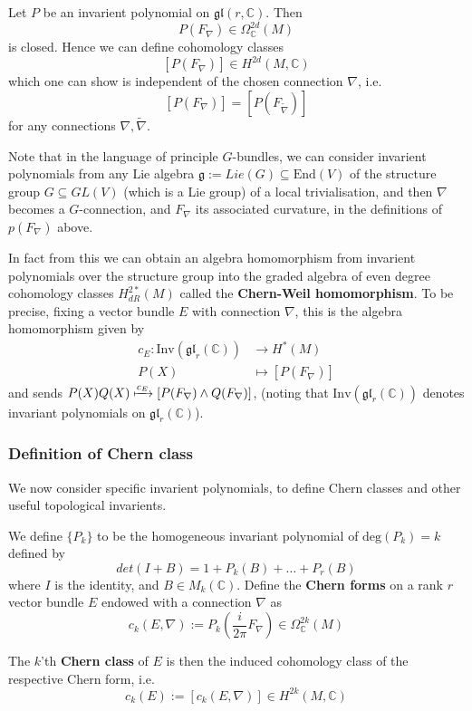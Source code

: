 \documentclass[a4paper]{article}
\theoremstyle{definition} \newtheorem*{definition}{Definition}
\theoremstyle{definition} \newtheorem*{definitions}{Definitions}
\theoremstyle{plain} \newtheorem{theorem}{Theorem}[section]
\theoremstyle{plain} \newtheorem{proposition}[theorem]{Proposition}
\theoremstyle{plain} \newtheorem{corollary}[theorem]{Corollary}
\theoremstyle{plain} \newtheorem{lemma}[theorem]{Lemma}
\theoremstyle{plain} \newtheorem{example}[theorem]{Example}
\newcommand{\defn}[1]{\textbf{#1}}
\newcommand{\complexnos}{\mathbb{C}}
\newcommand{\End}{\text{End}}
\begin{document}
Let $P$ be an invarient polynomial on $\mathfrak{gl}(r, \complexnos)$. Then
$$P(F_\nabla)\in \Omega^{2d}_\complexnos(M)$$
is closed. Hence we can define cohomology classes
$$[P(F_\nabla)]\in H^{2d}(M, \complexnos)$$
which one can show is independent of the chosen connection $\nabla$, i.e.
$$[P(F_\nabla)]=[P(F_{\tilde{\nabla}} )]$$
for any connections $\nabla, \tilde{\nabla}$. 

Note that in the language of principle $G$-bundles, we can consider invarient polynomials from any Lie algebra $\mathfrak{g}:=Lie(G)\subseteq \End(V)$ of the structure group $G\subseteq GL(V)$ (which is a Lie group) of a local trivialisation, and then $\nabla$ becomes a $G$-connection, and $F_\nabla$ its associated curvature, in the definitions of $p(F_\nabla)$ above. 

In fact from this we can obtain an algebra homomorphism from invarient polynomials over the structure group into the graded algebra of even degree cohomology classes $H^{2*}_{dR}(M)$ called the \defn{Chern-Weil homomorphism}. To be precise, fixing a vector bundle $E$ with connection $\nabla$, this is the algebra homomorphism given by
\begin{align*}
    c_E : \text{Inv}(\mathfrak{gl}_r(\complexnos)) & \to H^* (M) \\
     P(X) & \mapsto [P(F_\nabla)]
\end{align*}
and sends $P(X)Q(X)\xmapsto{c_E} [P(F_\nabla)\wedge Q(F_\nabla)]$, (noting that $\text{Inv}(\mathfrak{gl}_r(\complexnos))$ denotes invariant polynomials on $\mathfrak{gl}_r(\complexnos)$).

\subsubsection{Definition of Chern class}
We now consider specific invarient polynomials, to define Chern classes and other useful topological invarients. 

We define $\{P_k\}$ to be the homogeneous invariant polynomial of $\text{deg}(P_k)=k$ defined by 
$$det(I+B)=1+P_k(B)+\ldots +P_r(B)$$
where $I$ is the identity, and $B\in M_k(\complexnos)$. Define the \defn{Chern forms} on a rank $r$ vector bundle $E$ endowed with a connection $\nabla$ as 
$$c_k(E, \nabla):=P_k \left( \frac{i}{2\pi} F_\nabla \right) \in \Omega^{2k}_\complexnos (M)$$

The $k$'th \defn{Chern class} of $E$ is then the induced cohomology class of the respective Chern form, i.e. 
$$c_k(E):= [c_k(E, \nabla)] \in H^{2k}(M, \complexnos)$$
\end{document}
